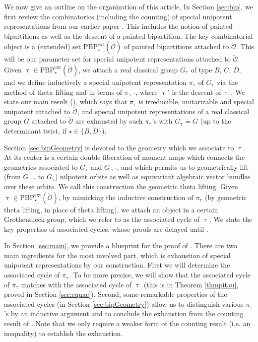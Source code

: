 \documentclass[11pt,a4paper]{amsart}
\newcommand{\CO}{{\mathcal {O}}}
\numberwithin{equation}{section}
\theoremstyle{remark}
\def\PBPes{\mathrm{PBP}^{\mathrm{ext}}_{\star}}
\begin{document}
We now give an outline on the organization of this article. In Section \ref{sec:bip}, we first review the combinatorics (including the counting) of special unipotent representations from our earlier paper \cite{BMSZa}. This includes the notion of painted bipartitions as well as the descent of a painted bipartition. The key combinatorial object is a (extended) set $\mathrm{\PBPes}(\check \CO)$ of painted bipartitions attached to $\check \CO$. This will be our parameter set for special unipotent representations attached to $\check \CO$. Given
$\uptau \in \mathrm{\PBPes}(\check \CO)$, we attach a real classical group $G_{\uptau}$ of type $B$, $C$, $D$, and we define inductively a special unipotent representation $\pi_{\uptau}$ of $G_{\uptau}$ via the method of theta lifting and in terms of $\pi_{\uptau'}$, where $\uptau'$ is the descent of $\uptau $. We state our main result (), which says that $\pi_\uptau$ is irreducible, unitarizable and special unipotent attached to $\check \CO$, and special unipotent representations of a real classical group $G$ attached to $\check \CO$
are exhausted by such $\pi_\uptau$'s with $G_{\uptau}=G$ (up to the determinant twist, if $\star\in \{B,D\}$).

Section \ref{sec:bipGeometry} is devoted to the geometry which we associate to $\uptau $. At its center is a certain double fiberation of moment maps which connects the geometries associated to
$G_{\uptau}$ and $G_{\uptau'}$, and which permits us to geometrically lift (from $G_{\uptau'}$ to $G_{\uptau}$) nilpotent orbits as well as equivariant algebraic vector bundles over these orbits. We call this construction the geometric theta lifting. Given
$\uptau \in \mathrm{\PBPes}(\check \CO)$, by mimicking the inductive construction of $\pi_\uptau$ (by geometric theta lifting, in place of theta lifting), we attach an object in a certain Grothendieck group, which we refer to as the associated cycle of $\uptau$. We state the key properties of associated cycles, whose proofs are delayed until  .

In Section \ref{sec:main}, we provide a blueprint for the proof of . There are two main ingredients for the most involved part, which is exhaustion of special unipotent representations by our construction. First we will determine the associated cycle of $\pi_{\uptau}$. To be more precise, we will show that the associated cycle of $\pi_{\uptau}$ matches with the associated cycle of $\uptau$ (this is in Theorem \ref{thmpitau}, proved in Section \ref{sec:equac}).
Second, some remarkable properties of the associated cycles (in Section \ref{sec:bipGeometry}) allow us to distinguish various $\pi_{\uptau}$'s by an inductive argument and to conclude the exhaustion from the counting result of \cite{BMSZa}. Note that we only require a weaker form of the counting result (i.e. an inequality) to establish the exhaustion.
\end{document}
